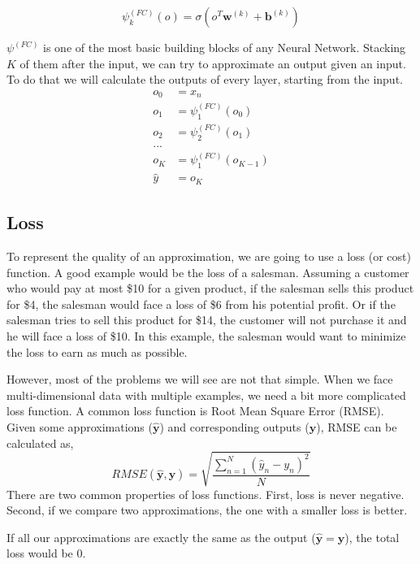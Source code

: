 $$ \psi^{(FC)}_k(o) = \sigma(o^T\mathbf{w}^{(k)} + \mathbf{b}^{(k)})$$

$\psi^{(FC)}$ is one of the most basic building blocks of any Neural Network. Stacking $K$ of them after the input, we can try to approximate an output given an input. To do that we will calculate the outputs of every layer, starting from the input. 
\begin{equation*}
\begin{split}
o_0 &= x_n\\
o_1 &= \psi_1^{(FC)}(o_0)\\ 
o_2 &= \psi_2^{(FC)}(o_1)\\
...&\\
o_K &= \psi_1^{(FC)}(o_{K-1})\\
\hat y &= o_K
\end{split}
\end{equation*}

\subsection{Loss}
To represent the quality of an approximation, we are going to use a loss (or cost) function. A good example would be the loss of a salesman. Assuming a customer who would pay at most \$10 for a given product, if the salesman sells this product for \$4, the salesman would face a loss of \$6 from his potential profit. Or if the salesman tries to sell this product for \$14, the customer will not purchase it and he will face a loss of \$10. In this example, the salesman would want to minimize the loss to earn as much as possible. 

However, most of the problems we will see are not that simple. When we face multi-dimensional data with multiple examples, we need a bit more complicated loss function. A common loss function is Root Mean Square Error (RMSE). Given some approximations ($\mathbf{\hat y}$) and corresponding outputs ($\mathbf{y}$), RMSE can be calculated as,
\begin{equation*}
RMSE(\mathbf{\hat y}, \mathbf{y}) = \sqrt{\frac{\sum^N_{n=1} (\hat y_n - y_n)^2 }{N}}
\end{equation*}
There are two common properties of loss functions. First, loss is never negative. Second, if we compare two approximations, the one with a smaller loss is better.

If all our approximations are exactly the same as the output ($  \mathbf{\hat y} =  \mathbf{y} $), the total loss would be 0. 

